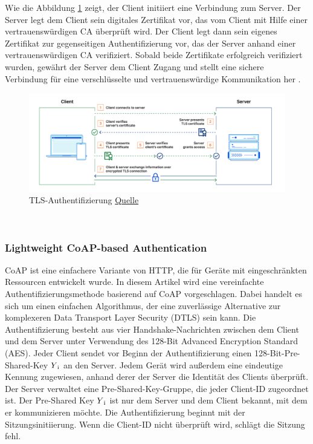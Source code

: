  
 Wie die Abbildung \ref{fig:mTLS} zeigt, der Client initiiert eine Verbindung zum Server. Der Server legt dem Client sein digitales Zertifikat vor, das vom Client mit Hilfe einer vertrauenswürdigen CA überprüft wird. Der Client legt dann sein eigenes Zertifikat zur gegenseitigen Authentifizierung vor, das der Server anhand einer vertrauenswürdigen CA verifiziert. Sobald beide Zertifikate erfolgreich verifiziert wurden, gewährt der Server dem Client Zugang und stellt eine sichere Verbindung für eine verschlüsselte und vertrauenswürdige Kommunikation her \cite{khatoun2022cybersecurity} \cite{barenkamp2021iot}.

  \begin{figure}[h]
  \centering
  \includegraphics[scale=0.4]{resources/MUTUALTLS.png}
 \caption{TLS-Authentifizierung \href{https://www.cloudflare.com/learning/access-management/what-is-mutual-tls/}{Quelle}}
  \label{fig:mTLS}
\end{figure}\

\subsubsection{Lightweight CoAP-based Authentication }

CoAP ist eine einfachere Variante von HTTP, die für Geräte mit eingeschränkten Ressourcen entwickelt wurde. In diesem Artikel\cite{jan2014robust} wird eine vereinfachte Authentifizierungsmethode basierend auf CoAP vorgeschlagen. Dabei handelt es sich um einen einfachen Algorithmus, der eine zuverlässige Alternative zur komplexeren Data Transport Layer Security (DTLS) sein kann. Die Authentifizierung besteht aus vier Handshake-Nachrichten zwischen dem Client und dem Server unter Verwendung des 128-Bit Advanced Encryption Standard (AES). Jeder Client sendet vor Beginn der Authentifizierung einen 128-Bit-Pre-Shared-Key \(Y\textsubscript{i}\) an den Server. Jedem Gerät wird außerdem eine eindeutige Kennung zugewiesen, anhand derer der Server die Identität des Clients überprüft. Der Server verwaltet eine Pre-Shared-Key-Gruppe, die jeder Client-ID zugeordnet ist. Der Pre-Shared Key \(Y\textsubscript{i}\) ist nur dem Server und dem Client bekannt, mit dem er kommunizieren möchte. Die Authentifizierung beginnt mit der Sitzungsinitiierung. Wenn die Client-ID nicht überprüft wird, schlägt die Sitzung fehl.

